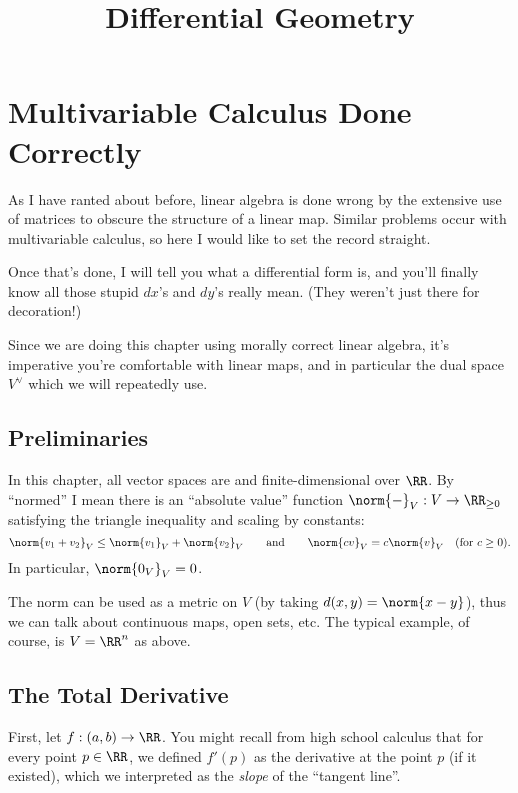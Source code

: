 \documentclass[11pt]{scrreprt}
\begin{document}
\title{Differential Geometry}
\maketitle



\chapter{Multivariable Calculus Done Correctly}
As I have ranted about before, linear algebra is done wrong
by the extensive use of matrices to obscure the structure of a linear map.
Similar problems occur with multivariable calculus, so here I would like to set 
the record straight.

Once that's done, I will tell you what a differential form is,
and you'll finally know all those stupid $dx$'s and $dy$'s really mean.
(They weren't just there for decoration!)

Since we are doing this chapter using morally correct linear algebra,
it's imperative you're comfortable with linear maps,
and in particular the dual space $V^\vee$ which we will repeatedly use.

\section{Preliminaries}
In this chapter, all vector spaces are  and finite-dimensional over $\RR$.
By ``normed'' I mean there is an ``absolute value'' function $\norm{-}_V : V \to \RR_{\ge 0}$
satisfying the triangle inequality and scaling by constants: 
\[
	\norm{v_1+v_2}_V \le \norm{v_1}_V+\norm{v_2}_V
	\qquad\text{and}\qquad
	\norm{cv}_V = c\norm{v}_V \quad\text{(for $c \ge 0$)}.
\]
In particular, $\norm{0_V}_V = 0$.

The norm can be used as a metric on $V$ (by taking $d(x,y) = \norm{x-y}$),
thus we can talk about continuous maps,  open sets, etc.
The typical example, of course, is $V = \RR^n$ as above.


\section{The Total Derivative}
First, let $f : (a,b) \to \RR$.
You might recall from high school calculus that for every point $p \in \RR$,
we defined $f'(p)$ as the derivative at the point $p$ (if it existed), which we interpreted as the \emph{slope} of
the ``tangent line''.
\end{document}
